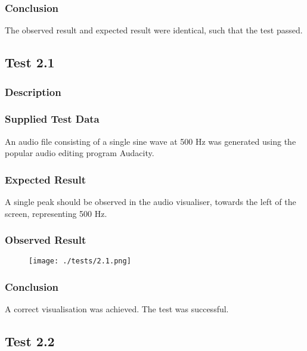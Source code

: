 \subsubsection*{Conclusion}
The observed result and expected result were identical, such that the test passed.

\pagebreak
\subsection{Test 2.1}
\subsubsection*{Description}
\paragraph{}
{
	\centering
}

\subsubsection*{Supplied Test Data}
An audio file consisting of a single sine wave at 500 Hz was generated using the popular audio editing program Audacity.

\subsubsection*{Expected Result}
A single peak should be observed in the audio visualiser, towards the left of the screen, representing 500 Hz.

\subsubsection*{Observed Result}
\label{sec:evidence2.1}
\begin{figure}[H]
	\texttt{[image: ./tests/2.1.png]}
\end{figure}

\subsubsection*{Conclusion}
A correct visualisation was achieved. The test was successful.

\pagebreak
\subsection{Test 2.2}
